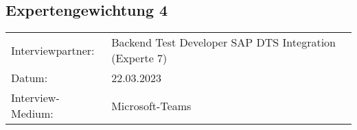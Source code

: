 \newpage
\subsection{Expertengewichtung 4}
        \begin{tabular}{ l l }
    Interviewpartner: & Backend Test Developer SAP DTS Integration (Experte 7)\\
    Datum: & 22.03.2023\\
    Interview-Medium: & Microsoft-Teams\\
\end{tabular}
\begin{center}
\begin{figure}[H]
    \centering
    \label{fig:CEA}
\end{figure}	
\end{center}
\begin{center}
\begin{figure}[H]
    \centering
    \label{fig:CEA}
\end{figure}	
\end{center}

